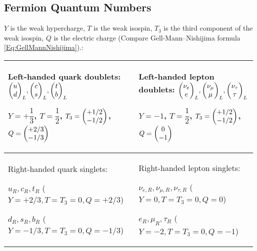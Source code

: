 		\newpage
	\subsection{Fermion Quantum Numbers}
		\label{Sec:FermionConstants}
		$Y$ is the weak hypercharge, $T$ is the weak isospin, $T_3$ is the third component of the weak isospin, $Q$ is the electric charge (Compare Gell-Mann--Nishijima formula \ref{Eq:GellMannNishijima}).:
		\begin{center}
			\begin{tabular}{| L{.46\textwidth} | L{.46\textwidth} |}
				\hline
				Left-handed quark doublets: 
				$\doublet{u}{d}_L, \doublet{c}{s}_L, \doublet{t}{b}_L$

				$Y=+\dfrac{1}{3}$, $T=\dfrac{1}{2}$,
				$T_3=\doublet{+1/2}{-1/2}$, $Q=\doublet{+2/3}{-1/3}$
				&
				Left-handed lepton doublets: $\doublet{\nu_e}{e}_L, \doublet{\nu_\mu}{\mu}_L, \doublet{\nu_\tau}{\tau}_L$

				$Y=-1$, $T=\dfrac{1}{2}$,				
				$T_3=\doublet{+1/2}{-1/2}$, $Q=\doublet{0}{-1}$
				\\
				\hline
				Right-handed quark singlets:
				
				$u_R,c_R,t_R$ ($Y=+2/3, T=T_3=0, Q=+2/3$)

				$d_R,s_R,b_R$ ($Y=-1/3, T=T_3=0, Q=-1/3$)
				&
				Right-handed lepton singlets: 
				
				$\nu_{e,R}, \nu_{\mu,R}, \nu_{\tau,R}$ ($Y=0, T=T_3=0, Q=0$)

				$e_R, \mu_R, \tau_R$ ($Y=-2, T=T_3=0, Q=-1$)
				\\
				\hline
			\end{tabular}
		\end{center}

		\renewcommand{\arraystretch}{2.0}
